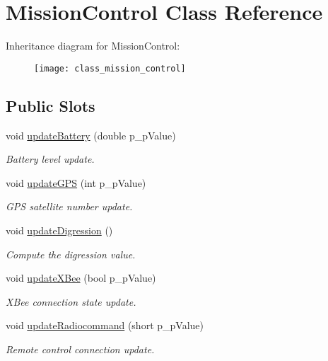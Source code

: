 \hypertarget{class_mission_control}{\section{Mission\-Control Class Reference}
\label{class_mission_control}
}
Inheritance diagram for Mission\-Control\-:\begin{figure}[H]
\begin{center}
\leavevmode
\texttt{[image: class\_mission\_control]}
\end{center}
\end{figure}
\subsection*{Public Slots}
\begin{DoxyCompactItemize}
\item 
void \hyperlink{class_mission_control_adbe09225acf7a5ccf8794d409f8667ee}{update\-Battery} (double p\-\_\-p\-Value)
\begin{DoxyCompactList}\small\item\em Battery level update. \end{DoxyCompactList}\item 
void \hyperlink{class_mission_control_a6e9b3c80b23a3d0ef5216e62a236bf10}{update\-G\-P\-S} (int p\-\_\-p\-Value)
\begin{DoxyCompactList}\small\item\em G\-P\-S satellite number update. \end{DoxyCompactList}\item 
void \hyperlink{class_mission_control_ae67759b6ec8fc47a1a68f4df314158e4}{update\-Digression} ()
\begin{DoxyCompactList}\small\item\em Compute the digression value. \end{DoxyCompactList}\item 
void \hyperlink{class_mission_control_ad9afdd9526dcd3155f2716b3141baf98}{update\-X\-Bee} (bool p\-\_\-p\-Value)
\begin{DoxyCompactList}\small\item\em X\-Bee connection state update. \end{DoxyCompactList}\item 
void \hyperlink{class_mission_control_af16b8e56676f7b755545a413d975159f}{update\-Radiocommand} (short p\-\_\-p\-Value)
\begin{DoxyCompactList}\small\item\em Remote control connection update. \end{DoxyCompactList}\item 

\end{DoxyCompactItemize}
